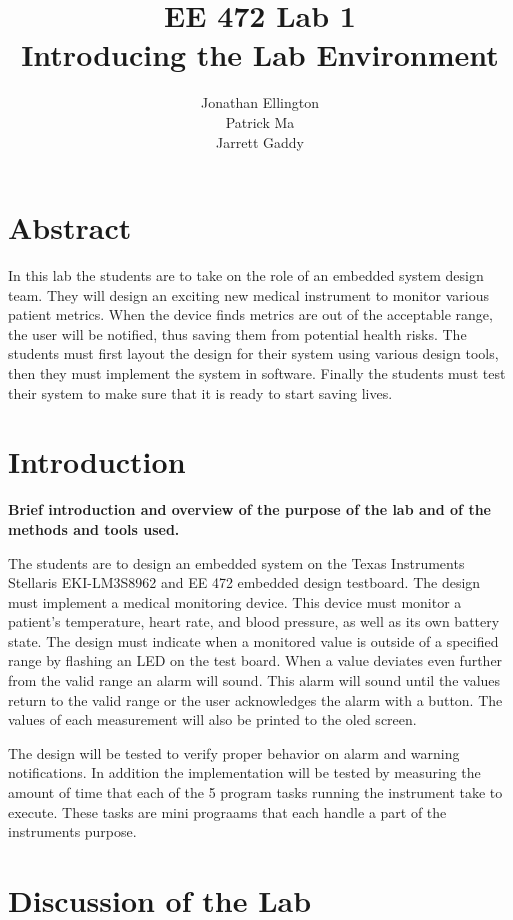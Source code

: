 \documentclass[12pt]{article} %
\title{\TitleFont EE 472 Lab 1 \\ Introducing the Lab Environment \vfill }
\author{\AuthorFont Jonathan Ellington \\ Patrick Ma \\ Jarrett Gaddy}
\date{}
\begin{document}
\maketitle
\thispagestyle{empty}
\pagebreak
\tableofcontents
\listoftables
\listoffigures
\thispagestyle{empty}
\pagebreak
\setcounter{page}{1}

\section{Abstract} In this lab the students are to take on the role of an
embedded system design team. They will design an exciting new medical
instrument to monitor various patient metrics. When the device finds metrics
are out of the acceptable range, the user will be notified, thus saving them
from potential health risks. The students must first layout the design for
their system using various design tools, then they must implement the system in
software. Finally the students must test their system to make sure that it is
ready to start saving lives.	

\section{Introduction}
\textbf{Brief introduction and overview of the purpose of the lab and of the methods and tools used.}

The students are to design an embedded system on the Texas Instruments
Stellaris EKI-LM3S8962 and EE 472 embedded design testboard. The design must
implement a medical monitoring device. This device must monitor a patient's
temperature, heart rate, and blood pressure, as well as its own battery state.
The design must indicate when a monitored value is outside of a specified range
by flashing an LED on the test board. When a value deviates even further from
the valid range an alarm will sound. This alarm will sound until the values
return to the valid range or the user acknowledges the alarm with a button. The
values of each measurement will also be printed to the oled screen.

The design will be tested to verify proper behavior on alarm and warning notifications. In addition the implementation will be tested by measuring the amount of time that each of the 5 program tasks running the instrument take to execute. These tasks are mini prograams that each handle a part of the instruments purpose.
 
\section{Discussion of the Lab}
\end{document}
